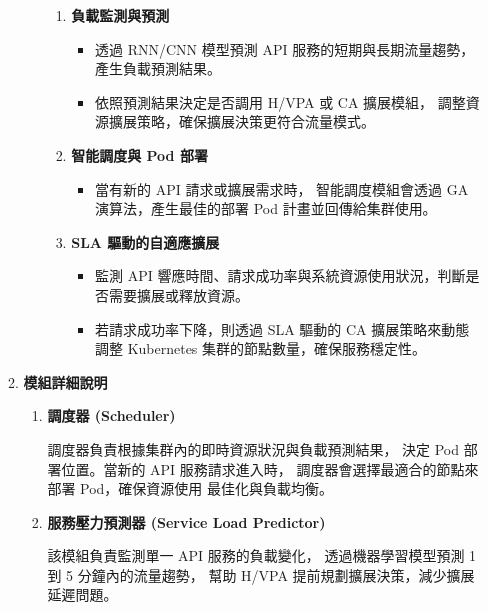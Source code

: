\documentclass[12pt,a4paper]{article}
\begin{document}
\begin{enumerate}[label={(\zhdig*)}, leftmargin=2\parindent, listparindent=\parindent]
\begin{enumerate}[label={(\arabic*)}, leftmargin=\parindent, listparindent=\parindent]
\begin{enumerate}[label={(\zhdig*)}, leftmargin=\parindent, listparindent=\parindent]
\begin{enumerate}[label={(\arabic*)}, leftmargin=\parindent, listparindent=\parindent]
    \item\textbf{
負載監測與預測}
\begin{itemize}[leftmargin=\parindent, listparindent=\parindent]

    \item 透過 RNN/CNN 模型預測 API 服務的短期與長期流量趨勢，產生負載預測結果。
    \item 依照預測結果決定是否調用 H/VPA 或 CA 擴展模組，
    調整資源擴展策略，確保擴展決策更符合流量模式。

\end{itemize}
    \item\textbf{
智能調度與 Pod 部署}
\begin{itemize}[leftmargin=\parindent, listparindent=\parindent]
    \item 當有新的 API 請求或擴展需求時，
    智能調度模組會透過 GA 演算法，產生最佳的部署 Pod 計畫並回傳給集群使用。
\end{itemize}
\item\textbf{SLA 驅動的自適應擴展}
\begin{itemize}[leftmargin=\parindent, listparindent=\parindent]
    \item 監測 API 響應時間、請求成功率與系統資源使用狀況，判斷是否需要擴展或釋放資源。
    \item 若請求成功率下降，則透過 SLA
    驅動的 CA 擴展策略來動態調整 Kubernetes 集群的節點數量，確保服務穩定性。
\end{itemize}


\end{enumerate}

\end{enumerate}


\item \textbf{
模組詳細說明}
\begin{enumerate}[label={(\zhdig*)}, leftmargin=\parindent, listparindent=\parindent]

    \item \textbf{
調度器 (Scheduler) }

調度器負責根據集群內的即時資源狀況與負載預測結果，
決定 Pod 部署位置。當新的 API 服務請求進入時，
調度器會選擇最適合的節點來部署 Pod，確保資源使用
最佳化與負載均衡。

    \item \textbf{服務壓力預測器 (Service Load Predictor)}

該模組負責監測單一 API 服務的負載變化，
透過機器學習模型預測 1 到 5 分鐘內的流量趨勢，
幫助 H/VPA 提前規劃擴展決策，減少擴展延遲問題。


\end{enumerate}
\end{enumerate}
\end{enumerate}
\end{document}
